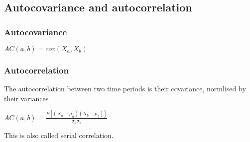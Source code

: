 
\subsection{Autocovariance and autocorrelation}

\subsubsection{Autocovariance}

\(AC(a,b)=cov(X_a, X_b)\)

\subsubsection{Autocorrelation}

The autocorrelation between two time periods is their covariance, normlised by their variances

\(AC(a,b)=\frac{E[(X_a-\mu_a)(X_b-\mu_b)]}{\sigma_a \sigma_b}\)

This is also called serial correlation.

